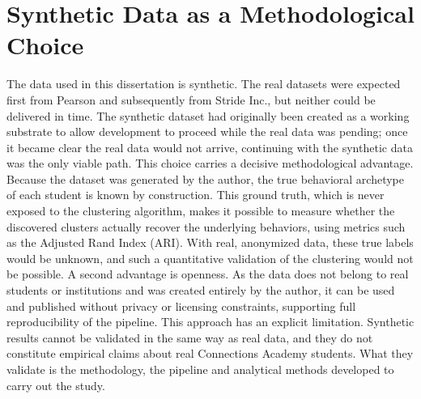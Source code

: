 \section{Synthetic Data as a Methodological Choice}
\label{sec:synthetic-data-rationale}
The data used in this dissertation is synthetic. The real datasets were expected first from Pearson and subsequently from Stride Inc., but neither could be delivered in time. The synthetic dataset had originally been created as a working substrate to allow development to proceed while the real data was pending; once it became clear the real data would not arrive, continuing with the synthetic data was the only viable path.
This choice carries a decisive methodological advantage. Because the dataset was generated by the author, the true behavioral archetype of each student is known by construction. This ground truth, which is never exposed to the clustering algorithm, makes it possible to measure whether the discovered clusters actually recover the underlying behaviors, using metrics such as the Adjusted Rand Index (ARI). With real, anonymized data, these true labels would be unknown, and such a quantitative validation of the clustering would not be possible.
A second advantage is openness. As the data does not belong to real students or institutions and was created entirely by the author, it can be used and published without privacy or licensing constraints, supporting full reproducibility of the pipeline.
This approach has an explicit limitation. Synthetic results cannot be validated in the same way as real data, and they do not constitute empirical claims about real Connections Academy students. What they validate is the methodology, the pipeline and analytical methods developed to carry out the study.
